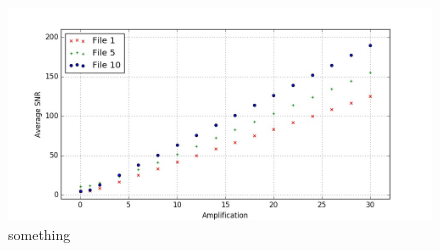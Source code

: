 \documentclass[aps,prd,preprint]{revtex4}
\begin{document}
\begin{figure}
	\includegraphics[width=\textwidth]{SNRs}
	\caption{something}
\end{figure}
\end{document}

